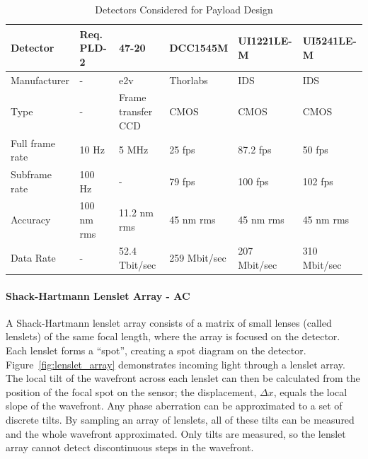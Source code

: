 \documentclass[12pt]{article}
\begin{document}
\begin{table}[!ht]
  \caption{Detectors Considered for Payload Design}
    \begin{tabular}{|l||l|llll|}
    \hline
    Detector                      & Req. PLD-2
    &47-20&DCC1545M&UI1221LE-M&UI5241LE-M\\ \hline \hline
    Manufacturer&-&e2v&Thorlabs&IDS&IDS\\ \hline
    Type&-&Frame transfer CCD&CMOS&CMOS&CMOS\\ \hline
    Full frame rate&  10 Hz            & 5 MHz                       & 25 fps                 & 87.2 fps            & 50 fps              \\ \hline
    Subframe rate& 100 Hz            & -                           & 79 fps                 & 100 fps             & 102 fps             \\ \hline
    Accuracy       & 100 nm rms        & 11.2 nm rms                 & 45 nm rms              & 45 nm rms           & 45 nm rms           \\ \hline
    Data Rate& -                 & 52.4 Tbit/sec               & 259 Mbit/sec           & 207 Mbit/sec        & 310 Mbit/sec        \\\hline
    \end{tabular}\label{table:payload_detectors}
\end{table}


\paragraph{Shack-Hartmann Lenslet Array - AC} \label{sec:payload_sh}

A Shack-Hartmann lenslet array consists of a matrix of small lenses (called lenslets) of the same focal length, where the array is focused on the detector. Each lenslet forms a “spot”, creating a spot diagram on the detector. Figure~\ref{fig:lenslet_array} demonstrates incoming light through a lenslet array. The local tilt of the wavefront across each lenslet can then be calculated from the position of the focal spot on the sensor; the displacement, $\Delta x$, equals the local slope of the wavefront. Any phase aberration can be approximated to a set of discrete tilts. By sampling an array of lenslets, all of these tilts can be measured and the whole wavefront approximated. Only tilts are measured, so the lenslet array cannot detect discontinuous steps in the wavefront.
\end{document}
